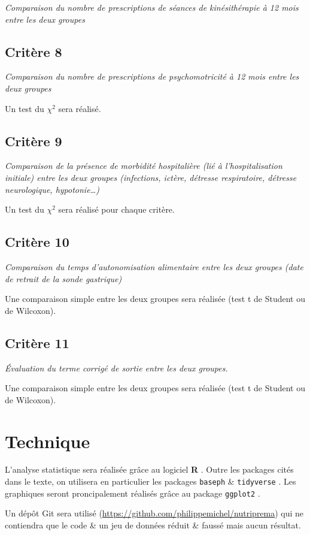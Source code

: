\documentclass[
  10 pt,
  a4paperpaper,
  french]{scrartcl}
\begin{document}
\emph{Comparaison du nombre de prescriptions de séances de
kinésithérapie à 12 mois entre les deux groupes}

\hypertarget{crituxe8re-8}{%
\subsection{Critère 8}\label{crituxe8re-8}}

\emph{Comparaison du nombre de prescriptions de psychomotricité à 12
mois entre les deux groupes}

Un test du \(\chi^2\) sera réalisé.

\hypertarget{crituxe8re-9}{%
\subsection{Critère 9}\label{crituxe8re-9}}

\emph{Comparaison de la présence de morbidité hospitalière (lié à
l'hospitalisation initiale) entre les deux groupes (infections, ictère,
détresse respiratoire, détresse neurologique, hypotonie\ldots)}

Un test du \(\chi^2\) sera réalisé pour chaque critère.

\hypertarget{crituxe8re-10}{%
\subsection{Critère 10}\label{crituxe8re-10}}

\emph{Comparaison du temps d'autonomisation alimentaire entre les deux
groupes (date de retrait de la sonde gastrique)}

Une comparaison simple entre les deux groupes sera réalisée (test t de
Student ou de Wilcoxon).

\hypertarget{crituxe8re-11}{%
\subsection{Critère 11}\label{crituxe8re-11}}

\emph{Évaluation du terme corrigé de sortie entre les deux groupes.}

Une comparaison simple entre les deux groupes sera réalisée (test t de
Student ou de Wilcoxon).

\hypertarget{technique}{%
\section{Technique}\label{technique}}

L'analyse statistique sera réalisée grâce au logiciel \textbf{R}
\citep{rstat}. Outre les packages cités dans le texte, on utilisera en
particulier les packages \texttt{baseph} \citep{baseph} \&
\texttt{tidyverse} \citep{tidy}. Les graphiques seront proncipalement
réalisés grâce au package \texttt{ggplot2} \citep{ggplot}.

Un dépôt Git sera utilisé
(\url{https://github.com/philippemichel/nutriprema}) qui ne contiendra
que le code \& un jeu de données réduit \& faussé mais aucun résultat.


  
\end{document}
